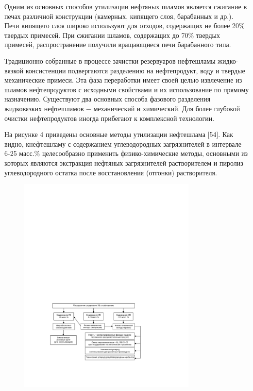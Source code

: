 Одним из основных способов утилизации нефтяных шламов является сжигание
в печах различной конструкции (камерных, кипящего слоя, барабанных и
др.). Печи кипящего слоя широко используют для отходов, содержащих не
более 20\% твердых примесей. При сжигании шламов, содержащих до 70\%
твердых примесей, распространение получили вращающиеся печи барабанного
типа.

Традиционно собранные в процессе зачистки резервуаров нефтешламы
жидко-вязкой консистенции подвергаются разделению на нефтепродукт, воду
и твердые механические примеси. Эта фаза переработки имеет своей целью
извлечение из шламов нефтепродуктов с исходными свойствами и их
использование по прямому назначению. Существуют два основных способа
фазового разделения жидковязких нефтешламов − механический и химический.
Для более глубокой очистки нефтепродуктов иногда прибегают к комплексной
технологии.

На рисунке 4 приведены основные методы утилизации нефтешлама {[}54{]}.
Как видно, кнефтешламу с содержанием углеводородных загрязнителей в
интервале 6-25 масс.\% целесообразно применить физико-химические методы,
основными из которых являются экстракция нефтяных загрязнителей
растворителем и пиролиз углеводородного остатка после восстановления
(отгонки) растворителя.


\begin{figure}[H]
	\centering
	\includegraphics[width=0.8\textwidth]{media/chem2/image67}
	\caption*{}
\end{figure}


